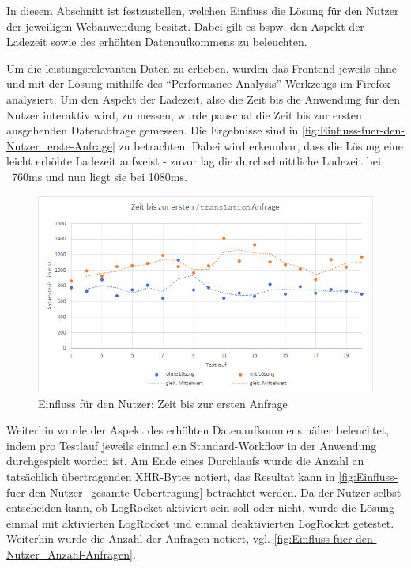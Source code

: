 
In diesem Abschnitt ist festzustellen, welchen Einfluss die Lösung für den Nutzer der jeweiligen Webanwendung besitzt. Dabei gilt es bspw. den Aspekt der Ladezeit sowie des erhöhten Datenaufkommens zu beleuchten.

Um die leistungsrelevanten Daten zu erheben, wurden das Frontend jeweils ohne und mit der Lösung mithilfe des \enquote{Performance Analysis}-Werkzeugs im Firefox \cite{FirefoxPerformanceAnalysis} analysiert. Um den Aspekt der Ladezeit, also die Zeit bis die Anwendung für den Nutzer interaktiv wird, zu messen, wurde pauschal die Zeit bis zur ersten ausgehenden Datenabfrage gemessen. Die Ergebnisse sind in \autoref{fig:Einfluss-fuer-den-Nutzer_erste-Anfrage} zu betrachten. Dabei wird erkennbar, dass die Lösung eine leicht erhöhte Ladezeit aufweist - zuvor lag die durchschnittliche Ladezeit bei ~760ms und nun liegt sie bei 1080ms.

\begin{figure}[H]
	\centering
	\includegraphics[width=1.00\linewidth]{data/Einfluss-fuer-den-Nutzer/Einfluss-fuer-den-Nutzer_erste-Anfrage.png}
	\caption{Einfluss für den Nutzer: Zeit bis zur ersten Anfrage}
	\label{fig:Einfluss-fuer-den-Nutzer_erste-Anfrage}
\end{figure}

Weiterhin wurde der Aspekt des erhöhten Datenaufkommens näher beleuchtet, indem pro Testlauf jeweils einmal ein Standard-Workflow in der Anwendung durchgespielt worden ist. Am Ende eines Durchlaufs wurde die Anzahl an tatsächlich\footnotemark{} übertragenden XHR-Bytes notiert, das Resultat kann in  \autoref{fig:Einfluss-fuer-den-Nutzer_gesamte-Uebertragung} betrachtet werden. Da der Nutzer selbst entscheiden kann, ob LogRocket aktiviert sein soll oder nicht, wurde die Lösung einmal mit aktivierten LogRocket und einmal deaktivierten LogRocket getestet. Weiterhin wurde die Anzahl der Anfragen notiert, vgl. \autoref{fig:Einfluss-fuer-den-Nutzer_Anzahl-Anfragen}.

